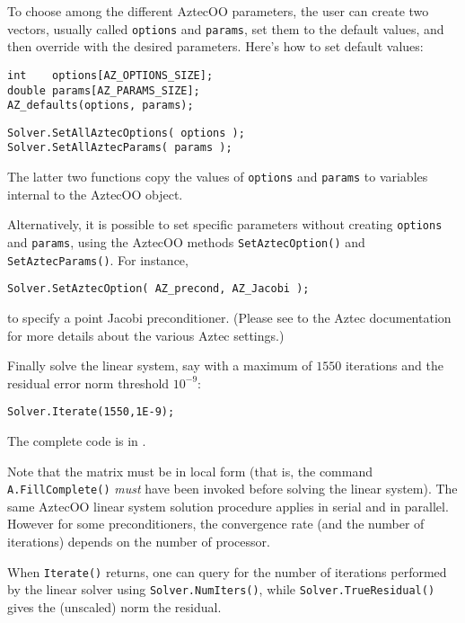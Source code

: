 To choose among the different AztecOO parameters, the user can create
two vectors, usually called \verb!options! and \verb!params!, set them
to the default values, and then override with the desired parameters.
Here's how to set default values: 
\begin{verbatim}
int    options[AZ_OPTIONS_SIZE];
double params[AZ_PARAMS_SIZE];
AZ_defaults(options, params);
\end{verbatim}
\begin{verbatim}
Solver.SetAllAztecOptions( options );
Solver.SetAllAztecParams( params );
\end{verbatim}
The latter two functions copy the values of \verb!options! and
\verb!params! 
to variables internal to the AztecOO object.

Alternatively, it is possible to set specific parameters without
creating \verb!options! and \verb!params!, using the AztecOO methods
\verb!SetAztecOption()! and \verb!SetAztecParams()!. 
For instance,
\begin{verbatim}
Solver.SetAztecOption( AZ_precond, AZ_Jacobi );
\end{verbatim}
to specify a point Jacobi preconditioner.  (Please see to the Aztec
documentation \cite{AztecOO-Users-Guide} for more details about the various Aztec settings.)

Finally solve the linear system, say with a maximum of $1550$ iterations and
the residual error norm threshold $10^{-9}$:
\begin{verbatim}
Solver.Iterate(1550,1E-9);
\end{verbatim}
The complete code is in .

Note that the matrix must be in local form (that is, the command
\verb!A.FillComplete()! {\em must} have been invoked before solving the
linear system).  The same AztecOO linear system solution procedure 
applies in serial and in parallel.  However for some preconditioners,
the convergence rate (and the number of iterations) 
depends on the number of processor.

When \verb!Iterate()! returns, one can query for the number of
iterations performed by the linear solver using
\verb!Solver.NumIters()!, while \verb!Solver.TrueResidual()! gives the
(unscaled) norm the residual.

